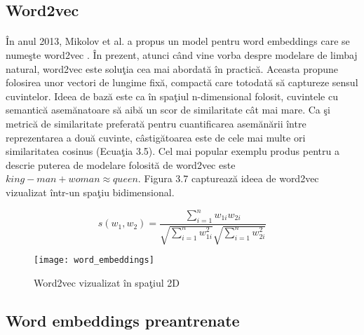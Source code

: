 \subsection{Word2vec}

\paragraph{}
\^ In anul 2013, Mikolov et al. a propus un model pentru word embeddings care se nume\c ste word2vec \cite{DBLP:journals/corr/MikolovSCCD13}. \^ In prezent, atunci c\^ and vine vorba despre modelare de limbaj natural, word2vec este solu\c tia cea mai abordat\u a \^ in practic\u a. Aceasta propune folosirea unor vectori de lungime fix\u a, compact\u a care totodat\u a s\u a captureze sensul cuvintelor. Ideea de baz\u a este ca \^ in spa\c tiul n-dimensional folosit, cuvintele cu semantic\u a asem\u anatoare s\u a aib\u a un scor de similaritate c\^at mai mare. Ca \c si metric\u a de similaritate preferat\u a pentru cuantificarea asem\u an\u arii \^ intre reprezentarea a dou\u a cuvinte, c\^ astig\u atoarea este de cele mai multe ori similaritatea cosinus (Ecua\c tia 3.5). Cel mai popular exemplu produs pentru a descrie puterea de modelare folosit\u a de word2vec este \(king - man + woman \approx queen\). Figura 3.7 captureaz\u a ideea de word2vec vizualizat \^ intr-un spa\c tiu bidimensional.

\begin{equation}
s(w_{1}, w_{2}) = \frac{\sum_{i=1}^{n}w_{1i}w_{2i}}{\sqrt{\sum_{i=1}^{n}w_{1i}^{2}}\sqrt{\sum_{i=1}^{n}w_{2i}^{2}}}
\end{equation}

\begin{figure}[H]
\centering
\texttt{[image: word\_embeddings]}
\caption{Word2vec vizualizat \^ in spa\c tiul 2D \cite{word-embeddings}}
\end{figure} 

\subsection{Word embeddings preantrenate}

